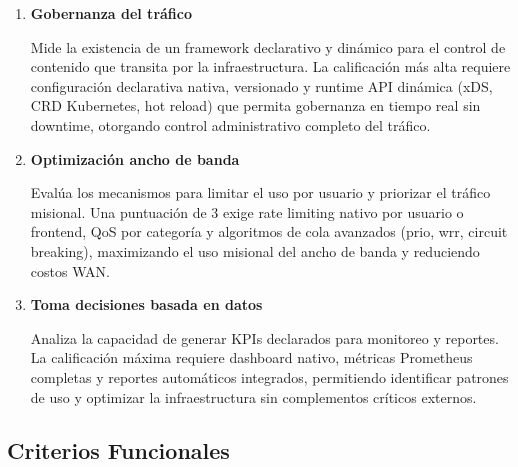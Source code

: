 \begin{enumerate}[resume*=criterios]
  \item \textbf{Gobernanza del tráfico}

  Mide la existencia de un framework declarativo y dinámico para el control de contenido que transita por la infraestructura. La calificación más alta requiere configuración declarativa nativa, versionado y runtime API dinámica (xDS, CRD Kubernetes, hot reload) que permita gobernanza en tiempo real sin downtime, otorgando control administrativo completo del tráfico.

  \item \textbf{Optimización ancho de banda}

  Evalúa los mecanismos para limitar el uso por usuario y priorizar el tráfico misional. Una puntuación de 3 exige rate limiting nativo por usuario o frontend, QoS por categoría y algoritmos de cola avanzados (prio, wrr, circuit breaking), maximizando el uso misional del ancho de banda y reduciendo costos WAN.

  \item \textbf{Toma decisiones basada en datos}

  Analiza la capacidad de generar KPIs declarados para monitoreo y reportes. La calificación máxima requiere dashboard nativo, métricas Prometheus completas y reportes automáticos integrados, permitiendo identificar patrones de uso y optimizar la infraestructura sin complementos críticos externos.

\end{enumerate}

\subsection{Criterios Funcionales}

